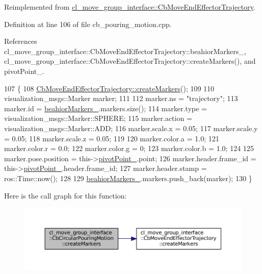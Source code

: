 Reimplemented from \hyperlink{classcl__move__group__interface_1_1CbMoveEndEffectorTrajectory_a442efa1d5bc9e9a16f74ecd31b13d9b5}{cl\+\_\+move\+\_\+group\+\_\+interface\+::\+Cb\+Move\+End\+Effector\+Trajectory}.



Definition at line 106 of file cb\+\_\+pouring\+\_\+motion.\+cpp.



References cl\+\_\+move\+\_\+group\+\_\+interface\+::\+Cb\+Move\+End\+Effector\+Trajectory\+::beahior\+Markers\+\_\+, cl\+\_\+move\+\_\+group\+\_\+interface\+::\+Cb\+Move\+End\+Effector\+Trajectory\+::create\+Markers(), and pivot\+Point\+\_\+.


\begin{DoxyCode}
107     \{
108         \hyperlink{classcl__move__group__interface_1_1CbMoveEndEffectorTrajectory_a442efa1d5bc9e9a16f74ecd31b13d9b5}{CbMoveEndEffectorTrajectory::createMarkers}();
109 
110         visualization\_msgs::Marker marker;
111 
112         marker.ns = \textcolor{stringliteral}{"trajectory"};
113         marker.id = \hyperlink{classcl__move__group__interface_1_1CbMoveEndEffectorTrajectory_a809fb5385adf27c0a1c8f8136566949c}{beahiorMarkers\_}.markers.size();
114         marker.type = visualization\_msgs::Marker::SPHERE;
115         marker.action = visualization\_msgs::Marker::ADD;
116         marker.scale.x = 0.05;
117         marker.scale.y = 0.05;
118         marker.scale.z = 0.05;
119 
120         marker.color.a = 1.0;
121         marker.color.r = 0.0;
122         marker.color.g = 0;
123         marker.color.b = 1.0;
124 
125         marker.pose.position = this->\hyperlink{classcl__move__group__interface_1_1CbCircularPouringMotion_a4c100d8ba3e57f7ddfb614017d115fca}{pivotPoint\_}.point;
126         marker.header.frame\_id = this->\hyperlink{classcl__move__group__interface_1_1CbCircularPouringMotion_a4c100d8ba3e57f7ddfb614017d115fca}{pivotPoint\_}.header.frame\_id;
127         marker.header.stamp = ros::Time::now();
128 
129         \hyperlink{classcl__move__group__interface_1_1CbMoveEndEffectorTrajectory_a809fb5385adf27c0a1c8f8136566949c}{beahiorMarkers\_}.markers.push\_back(marker);
130     \}
\end{DoxyCode}
Here is the call graph for this function\+:
\nopagebreak
\begin{figure}[H]
\begin{center}
\leavevmode
\includegraphics[width=350pt]{classcl__move__group__interface_1_1CbCircularPouringMotion_a26d603b1d9bdbf5b71da6c1c4af2c322_cgraph}
\end{center}
\end{figure}
